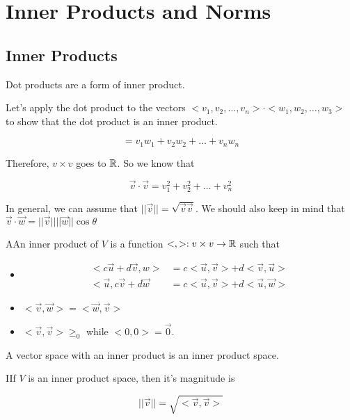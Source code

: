 \chapter{Inner Products and Norms}

\section{Inner Products}

	Dot products are a form of inner product.

	Let's apply the dot product to the vectors $<v_1,v_2,\ldots,v_n>\cdot<w_1,w_2,\ldots,w_3>$ to show that the dot product is an inner product.

	\begin{equation}
		=v_1w_1+v_2w_2+\ldots+v_nw_n
	\end{equation}

	Therefore, $v\times v$ goes to $\mathbb{R}$. So we know that 

	\begin{equation}
		\vec{v}\cdot\vec{v}=v_1^2+v_2^2+\ldots+v_n^2
	\end{equation}

	In general, we can assume that $ | | \vec{v} | | = \sqrt{\vec{v}\vec{v}}$. We should also keep in mind that $\vec{v}\cdot\vec{w}= | | \vec{v} | | | | \vec{w} | | \cos\theta$ 

	\begin{definition}
		AAn inner product of $V$ is a function $<,>:v\times v\to\mathbb{R}$ such that

		\begin{itemize}
			\item\begin{align}
					<c\vec{u}+d\vec{v},w> &= c<\vec{u},\vec{v}>+d<\vec{v},\vec{u}>\\
				<\vec{u},c\vec{v}+d\vec{w}&=c<\vec{u},\vec{v}>+d<\vec{u},\vec{w}>
			\end{align}
			\item $<\vec{v},\vec{w}> = <\vec{w}, \vec{v}>$
			\item $<\vec{v},\vec{v}>\ge_0$ while $<0,0> = \vec{0}$.	
		\end{itemize}
	\end{definition}

	A vector space with an inner product is an inner product space.

	\begin{definition}
		IIf $V$ is an inner product space, then it's magnitude is 
		
		\begin{equation}
			| | \vec{v} | | = \sqrt{<\vec{v},\vec{v}>} 
		\end{equation}
	\end{definition}

